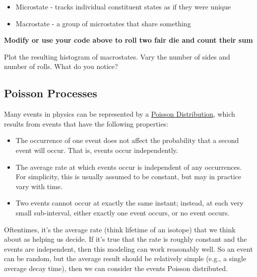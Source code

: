\begin{itemize}
\tightlist
\item
  Microstate - tracks individual constituent states as if they were
  unique
\item
  Macrostate - a group of microstates that share something
\end{itemize}

\textbf{Modify or use your code above to roll two fair die and count
their sum}

Plot the resulting histogram of macrostates. Vary the number of sides
and number of rolls. What do you notice?

\begin{Shaded}
\begin{Highlighting}[]
\end{Highlighting}
\end{Shaded}

\subsection{Poisson Processes}\label{poisson-processes}

Many events in physics can be represented by a
\href{https://en.wikipedia.org/wiki/Poisson_distribution}{Poisson
Distribution}, which results from events that have the following
properties:

\begin{itemize}
\tightlist
\item
  The occurrence of one event does not affect the probability that a
  second event will occur. That is, events occur independently.
\item
  The average rate at which events occur is independent of any
  occurrences. For simplicity, this is usually assumed to be constant,
  but may in practice vary with time.
\item
  Two events cannot occur at exactly the same instant; instead, at each
  very small sub-interval, either exactly one event occurs, or no event
  occurs.
\end{itemize}

Oftentimes, it's the average rate (think lifetime of an isotope) that we
think about as helping us decide. If it's true that the rate is roughly
constant and the events are independent, then this modeling can work
reasonably well. So an event can be random, but the average result
should be relatively simple (e.g., a single average decay time), then we
can consider the events Poisson distributed.

